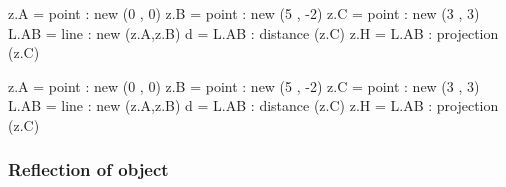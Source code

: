 \begin{minipage}{0.5\textwidth}
\begin{tkzexample}[latex=0cm,small,code only]
\begin{tkzelements}
   z.A    = point : new (0 , 0)
   z.B    = point : new (5 , -2)
   z.C    = point : new (3 , 3)
   L.AB   = line : new (z.A,z.B)
   d      = L.AB : distance (z.C)
   z.H    = L.AB : projection (z.C)
\end{tkzelements}
\end{tkzexample}
\end{minipage}
\begin{minipage}{0.5\textwidth}
\begin{tkzelements}
   z.A    = point : new (0 , 0)
   z.B    = point : new (5 , -2)
   z.C    = point : new (3 , 3)
   L.AB   = line : new (z.A,z.B)
   d      = L.AB : distance (z.C)
   z.H    = L.AB : projection (z.C)
\end{tkzelements}
\hspace*{\fill}
\hspace*{\fill}
\end{minipage}


\subsubsection{Reflection of object} %
\label{ssub:reflection_of_object}

